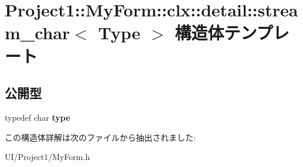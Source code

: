 \hypertarget{struct_project1_1_1_my_form_1_1clx_1_1detail_1_1stream__char}{}\section{Project1\+:\+:My\+Form\+:\+:clx\+:\+:detail\+:\+:stream\+\_\+char$<$ Type $>$ 構造体テンプレート}
\label{struct_project1_1_1_my_form_1_1clx_1_1detail_1_1stream__char}
\subsection*{公開型}
\begin{DoxyCompactItemize}
\item 
\mbox{\label{struct_project1_1_1_my_form_1_1clx_1_1detail_1_1stream__char_af3162ed23258265b5a5a3257fd258d55}} 
typedef char {\bfseries type}
\end{DoxyCompactItemize}


この構造体詳解は次のファイルから抽出されました\+:\begin{DoxyCompactItemize}
\item 
U\+I/\+Project1/My\+Form.\+h\end{DoxyCompactItemize}

